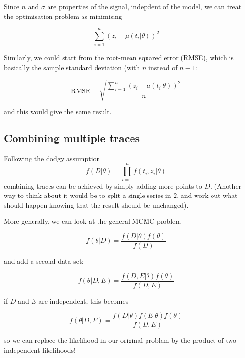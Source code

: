 \documentclass[preprint,authoryear,10pt]{elsarticle}
\begin{document}
Since $n$ and $\sigma$ are properties of the signal, indepdent of the model, we
 can treat the optimisation problem as minimising

\begin{equation}
\sum_{i=1}^n \left(z_i - \mu(t_i|\theta) \right)^2
\end{equation}

Similarly, we could start from the root-mean squared error (RMSE), which is
 basically the sample standard deviation (with $n$ instead of $n-1$:

\begin{equation}
\text{RMSE} = \sqrt{\frac{\sum_{i=1}^n \left(z_i - \mu(t_i|\theta) \right)^2}{n}}
\end{equation}

and this would give the same result.



\subsection{Combining multiple traces}

Following the dodgy assumption
\begin{equation}
f(D|\theta) = \prod_{i=1}^{n} f(t_i,z_i|\theta)
\end{equation}
combining traces can be achieved by simply adding more points to $D$.
(Another way to think about it would be to split a single series in 2, and work
 out what should happen knowing that the result should be unchanged).

More generally, we can look at the general MCMC problem

\begin{equation}
f(\theta|D) = \frac{f(D|\theta)f(\theta)}{f(D)}
\end{equation}

and add a second data set:

\begin{equation}
f(\theta|D,E) = \frac{f(D,E|\theta)f(\theta)}{f(D,E)}
\end{equation}

if $D$ and $E$ are independent, this becomes

\begin{equation}
f(\theta|D,E) = \frac{f(D|\theta)f(E|\theta)f(\theta)}{f(D,E)}
\end{equation}

so we can replace the likelihood in our original problem by the product of two
independent likelihoods!
\end{document}
